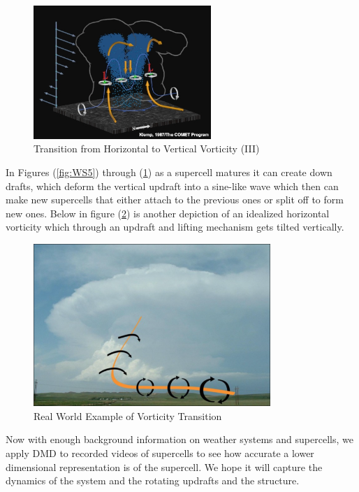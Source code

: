 \documentclass[12pt]{report}
\begin{document}
\begin{figure}[H]
    \centering
    \includegraphics[width=0.6\textwidth]{Weather pics/WS7.jpg}
    \caption{Transition from Horizontal to Vertical Vorticity (III)} \label{fig:WS7}
\end{figure}
\noindent

In Figures (\ref{fig:WS5}) through (\ref{fig:WS7}) as a supercell matures it can create down drafts, which deform the vertical updraft into a sine-like wave which then can make new supercells that either attach to the previous ones or split off to form new ones. Below in figure (\ref{fig:WS8}) is another depiction of an idealized horizontal vorticity which through an updraft and lifting mechanism gets tilted vertically.

\begin{figure}[H]
    \centering
    \includegraphics[width=0.8\textwidth]{Weather pics/WS8.png}
    \caption{Real World Example of Vorticity Transition} \label{fig:WS8}
\end{figure}
\noindent

Now with enough background information on weather systems and supercells, we apply DMD to recorded videos of supercells to see how accurate a
lower dimensional representation is of the supercell. We hope it
will capture the dynamics of the system and the rotating updrafts and the
structure.
\end{document}
